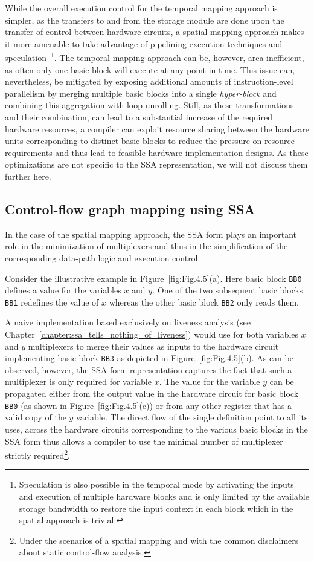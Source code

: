 While the overall execution control for the temporal mapping approach is simpler, as the transfers to and from the storage module are done upon the transfer of control between hardware circuits, a spatial mapping approach makes it more amenable to take advantage of pipelining execution techniques and speculation~\footnote{Speculation is also possible in the temporal mode by activating the inputs and execution of multiple hardware blocks and is only limited by the available storage bandwidth to restore the input context in each block which in the spatial approach is trivial.}. 
The temporal mapping approach can be, however, area-inefficient, as often only one basic block will execute at any point in time. 
This issue can, nevertheless, be mitigated by exposing additional amounts of instruction-level parallelism by merging multiple basic blocks into a single {\em hyper-block} and combining this aggregation with loop unrolling. 
Still, as these transformations and their combination, can lead to a substantial increase of the required hardware resources, a compiler can exploit resource sharing between the hardware units corresponding to distinct basic blocks to reduce the pressure on resource requirements and thus lead to feasible hardware implementation designs. 
As these optimizations are not specific to the SSA representation, we will not discuss them further here. 

\subsection{Control-flow graph mapping using SSA}
\label{sec:cfg_ssa_mapping}
In the case of the spatial mapping approach, the SSA form plays an important role in the minimization of multiplexers and thus in the simplification of the corresponding data-path logic and execution control.

Consider the illustrative example in Figure~\ref{fig:Fig.4.5}(a). 
Here basic block {\tt BB0} defines a value for the variables $x$ and $y$. 
One of the two subsequent basic blocks {\tt BB1} redefines the value of $x$ whereas the other basic block {\tt BB2} only reads them.

A naive implementation based exclusively on liveness analysis (see Chapter~\ref{chapter:ssa_tells_nothing_of_liveness}) would use for both variables $x$ and $y$ multiplexers to merge their values as inputs to the hardware circuit implementing basic block {\tt BB3} as depicted in Figure~\ref{fig:Fig.4.5}(b). 
As can be observed, however, the SSA-form representation captures the fact that such a multiplexer is only required for variable $x$. 
The value for the variable $y$ can be propagated either from the output value in the hardware circuit for basic block {\tt BB0} (as shown in Figure~\ref{fig:Fig.4.5}(c)) or from any other register that has a valid copy of the $y$ variable. 
The direct flow of the single definition point to all its uses, across the hardware circuits corresponding to the various basic blocks in the SSA form thus allows a compiler to use the minimal number of multiplexer strictly required\footnote{Under the scenarios of a spatial mapping and with the common disclaimers about static control-flow analysis.}.

